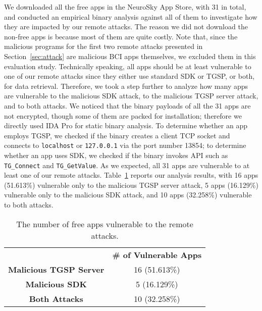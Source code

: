 \indent We downloaded all the free apps in the NeuroSky App Store, with 31 in total, and conducted an empirical binary analysis against all of them to investigate how they are impacted by our remote attacks. The reason we did not download the non-free apps is because most of them are quite  costly. Note that, since the malicious programs for the first two remote attacks presented in Section~\ref{sec:attack} are malicious BCI apps themselves, we excluded them in this evaluation study. Technically speaking, all apps should be at least vulnerable to one of our remote attacks since they either use standard SDK or TGSP, or both, for data retrieval. Therefore, we took a step further to analyze how many apps are vulnerable to the malicious SDK attack, to the malicious TGSP server attack, and to both attacks. We noticed that the binary payloads of all the 31 apps are not encrypted, though some of them are packed for installation; therefore we directly used IDA Pro for static binary analysis. To determine whether an app employs TGSP, we checked if the binary creates a client TCP socket and connects to \texttt{localhost} or \texttt{127.0.0.1} via the port number 13854; to determine whether an app uses SDK, we checked if the binary invokes API such as \texttt{TG\_Connect} and \texttt{TG\_GetValue}. As we expected, all 31 apps are vulnerable to at least one of our remote attacks. Table~\ref{tbl:influence} reports our analysis results, with 16 apps (51.613\%) vulnerable only to the malicious TGSP server attack, 5 apps (16.129\%) vulnerable only to the malicious SDK attack, and 10 apps (32.258\%) vulnerable to both attacks.

\begin{table}[!htb]
\centering
\caption{The number of free apps vulnerable to the remote attacks.}
\label{tbl:influence}
\begin{tabular}{cc}
\Xhline{2\arrayrulewidth}
\textbf{}                       & \textbf{\# of Vulnerable Apps} \\ \Xhline{2\arrayrulewidth}
\textbf{Malicious TGSP Server} & 16 (51.613\%)                  \\ \hline
\textbf{Malicious SDK} & 5 (16.129\%)                   \\ \hline
\textbf{Both Attacks}           & 10 (32.258\%)                  \\ \hline
\end{tabular}
\end{table}

